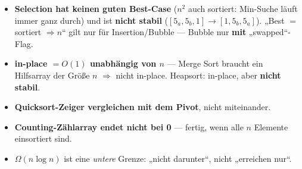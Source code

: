 \documentclass[10pt,a4paper]{article}
\begin{document}
\begin{fallenbox}
\small\begin{itemize}
  \item \textbf{Selection hat keinen guten Best-Case} ($n^2$ auch sortiert: Min-Suche läuft immer
        ganz durch) und ist \textbf{nicht stabil} ($[5_a,5_b,1] \to [1,5_b,5_a]$).
        „Best $=$ sortiert $\Rightarrow n$`` gilt nur für Insertion/Bubble — Bubble nur
        \textbf{mit} „swapped``-Flag.
  \item \textbf{in-place $= O(1)$ unabhängig von $n$} — Merge Sort braucht ein Hilfsarray der
        Größe $n$ $\Rightarrow$ nicht in-place. Heapsort: in-place, aber \textbf{nicht stabil}.
  \item \textbf{Quicksort-Zeiger vergleichen mit dem Pivot}, nicht miteinander.
  \item \textbf{Counting-Zählarray endet nicht bei 0} — fertig, wenn alle $n$ Elemente einsortiert sind.
  \item $\Omega(n\log n)$ ist eine \emph{untere} Grenze: „nicht darunter``, nicht „erreichen nur``.
\end{itemize}
\end{fallenbox}
\end{document}
